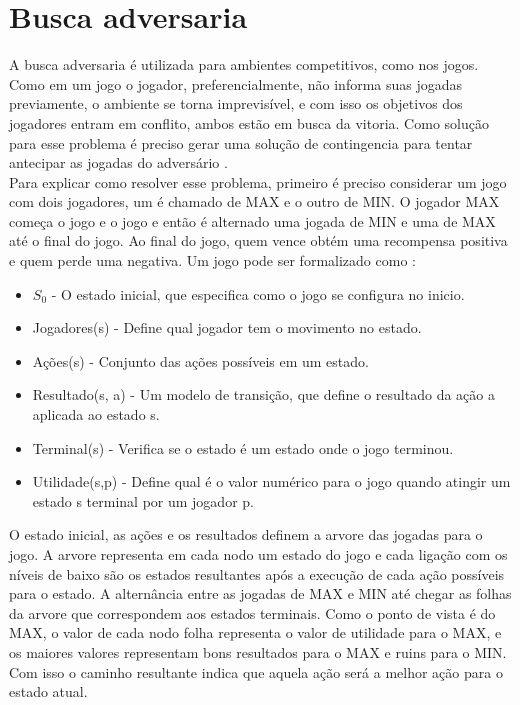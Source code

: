 
\section{Busca adversaria}

A busca adversaria é utilizada para ambientes competitivos, como nos jogos. Como em um jogo o jogador, preferencialmente, não informa suas jogadas previamente, o ambiente se torna imprevisível, e com isso os objetivos dos jogadores entram em conflito, ambos estão em busca da vitoria. Como solução para esse problema é preciso gerar uma solução de contingencia para tentar antecipar as jogadas do adversário \cite{intelligence2003modern}. \\ 

Para explicar como resolver esse problema, primeiro é preciso considerar um jogo com dois jogadores, um é chamado de MAX e o outro de MIN. O jogador MAX começa o jogo e o jogo e então é alternado uma jogada de MIN e uma de MAX até o final do jogo. Ao final do jogo, quem vence obtém uma recompensa positiva e quem perde uma negativa. Um jogo pode ser formalizado como \cite{intelligence2003modern}:

\begin{itemize}
	\item $S_{0}$ - O estado inicial, que especifica como o jogo se configura no inicio.
	\item Jogadores(s) -  Define qual jogador tem o movimento no estado.
	\item Ações(s) - Conjunto das ações possíveis em um estado.
	\item Resultado(s, a) - Um modelo de transição, que define o resultado da ação a aplicada ao estado s.
	\item Terminal(s) - Verifica se o estado é um estado onde o jogo terminou.
	\item Utilidade(s,p) - Define qual é o valor numérico para o jogo quando atingir um estado s terminal por um jogador p. 
\end{itemize}
 
O estado inicial, as ações e os resultados definem a arvore das jogadas para o jogo. A arvore representa em cada nodo um estado do jogo e cada ligação com os níveis de baixo são os estados resultantes após a execução de cada ação possíveis para o estado. A alternância entre as jogadas de MAX e MIN até chegar as folhas da arvore que correspondem aos estados terminais. Como o ponto de vista é do MAX, o valor de cada nodo folha representa o valor de utilidade para o MAX, e os maiores valores representam bons resultados para o MAX e ruins para o MIN. Com isso o caminho resultante indica que aquela ação será a melhor ação para o estado atual. 

